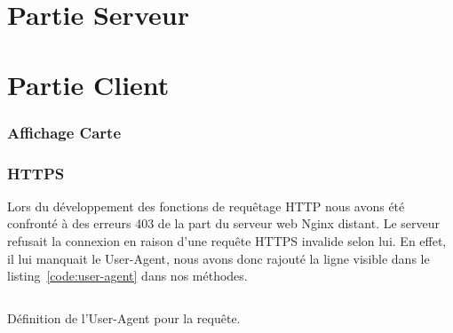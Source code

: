 \section{Partie Serveur}
\section{Partie Client}
	\subsubsection{Affichage Carte}
	\subsubsection{HTTPS}
		Lors du développement des fonctions de requêtage HTTP nous avons été confronté à des erreurs 403 de la part du serveur web Nginx distant. Le serveur refusait la connexion en raison d'une requête HTTPS invalide selon lui. En effet, il lui manquait le User-Agent, nous avons donc rajouté la ligne visible dans le listing~\ref{code:user-agent} dans nos méthodes.

		\begin{code}
			\inputminted[fontsize=\small]{java}{code/user-agent.java}
			\caption{Définition de l'User-Agent pour la requête.}
			\label{code:user-agent}
		\end{code}
